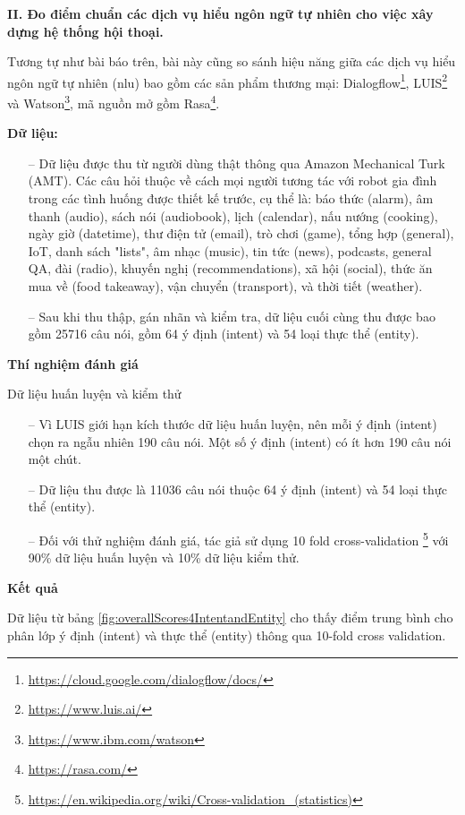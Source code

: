 \textbf{II. Đo điểm chuẩn các dịch vụ hiểu ngôn ngữ tự nhiên cho việc xây dựng hệ thống hội thoại.}

Tương tự như bài báo trên, bài này cũng so sánh hiệu năng giữa các dịch vụ hiểu ngôn ngữ tự nhiên (\ac{nlu}) bao gồm các sản phẩm thương mại: Dialogflow\footnote{\url{https://cloud.google.com/dialogflow/docs/}}, LUIS\footnote{\url{https://www.luis.ai/}} và Watson\footnote{\url{https://www.ibm.com/watson}}, mã nguồn mở gồm Rasa\footnote{\url{https://rasa.com/}}.


\textbf{Dữ liệu: }

\begin{itemize}
    \item[--] Dữ liệu được thu từ người dùng thật thông qua Amazon Mechanical Turk (AMT). Các câu hỏi thuộc về cách mọi người tương tác với robot gia đình trong các tình huống được thiết kế trước, cụ thể là: báo thức (alarm), âm thanh (audio), sách nói (audiobook), lịch (calendar), nấu nướng (cooking), ngày giờ (datetime), thư điện tử (email), trò chơi (game), tổng hợp (general), IoT, danh sách "lists", âm nhạc (music), tin tức (news), podcasts, general QA, đài (radio), khuyến nghị (recommendations), xã hội (social), thức ăn mua về (food takeaway), vận chuyển (transport), và thời tiết (weather).
    \item[--] Sau khi thu thập, gán nhãn và kiểm tra, dữ liệu cuối cùng thu được bao gồm 25716 câu nói, gồm 64 ý định (intent) và 54 loại thực thể (entity).
\end{itemize}

\textbf{Thí nghiệm đánh giá}

Dữ liệu huấn luyện và kiểm thử
\begin{itemize}
    \item[--] Vì LUIS giới hạn kích thước dữ liệu huấn luyện, nên mỗi ý định (intent) chọn ra ngẫu nhiên 190 câu nói. Một số ý định (intent) có ít hơn 190 câu nói một chút.
    \item[--] Dữ liệu thu được là 11036 câu nói thuộc 64 ý định (intent) và 54 loại thực thể (entity).
    \item[--] Đối với thử nghiệm đánh giá, tác giả sử dụng 10 fold cross-validation \footnote{\url{https://en.wikipedia.org/wiki/Cross-validation_(statistics)}} với 90\% dữ liệu huấn luyện và 10\% dữ liệu kiểm thử.
\end{itemize}

\textbf{Kết quả}

Dữ liệu từ bảng \ref{fig:overallScores4IntentandEntity} cho thấy điểm trung bình cho phân lớp ý định (intent) và thực thể (entity) thông qua 10-fold cross validation.

